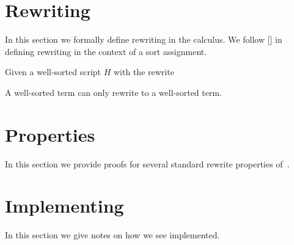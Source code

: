 \documentclass[letterpaper,11pt]{article}
\begin{document}


\section{\bhax Rewriting}
\label{sec:rewriting}

In this section we formally define rewriting in the \hax calculus. We follow [] in
defining rewriting in the context of a sort assignment.

\begin{definition}[substitution]
  
\end{definition}


\begin{theorem}
  Given a well-sorted \hax script $H$ with the rewrite 


A well-sorted term can only rewrite to a well-sorted term.
\end{theorem}


\section{\bhax Properties}
\label{sec:properties}

In this section we provide proofs for several standard rewrite properties of~\hax.




\section{Implementing \hax}
\label{sec:implement}

In this section we give notes on how we see \hax implemented.



\end{document}
